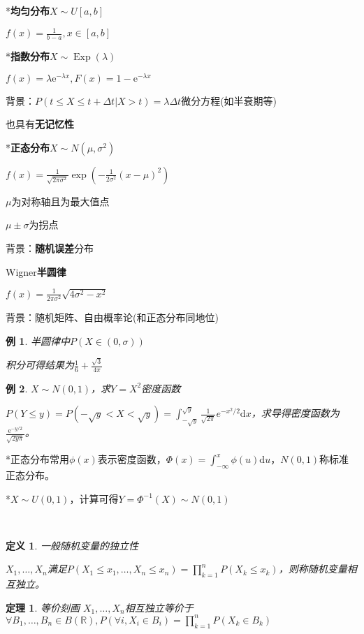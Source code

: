 \documentclass[a4paper,UTF8,fontset=windows]{ctexart}
\newtheorem{thm}{定理}[section]
\newtheorem{exmp}{例}[section]
\newtheorem{defi}{定义}[section]
\DeclareMathOperator{\Exp}{Exp}
\begin{document}
*\textbf{均匀分布}$X\sim U[a,b]$

$f(x)=\frac{1}{b-a},x\in[a,b]$

*\textbf{指数分布}$X\sim \Exp(\lambda)$

$f(x)=\lambda\mathrm{e}^{-\lambda x},F(x)=1-\mathrm{e}^{-\lambda x}$

背景：$P(t\le X\le t+\Delta t|X>t)=\lambda\Delta t$微分方程(如半衰期等)

也具有\textbf{无记忆性}

*\textbf{正态分布}$X\sim N(\mu,\sigma^2)$

$f(x)=\frac{1}{\sqrt{2\pi\sigma^2}}\exp\left(-\frac{1}{2\sigma^2}(x-\mu)^2\right)$

$\mu$为对称轴且为最大值点

$\mu\pm\sigma$为拐点

背景：\textbf{随机误差}分布

Wigner\textbf{半圆律}

$f(x)=\frac{1}{2\pi\sigma^2}\sqrt{4\sigma^2-x^2}$

背景：随机矩阵、自由概率论(和正态分布同地位)

\begin{exmp}
半圆律中$P(X\in(0,\sigma))$

积分可得结果为$\frac{1}{6}+\frac{\sqrt3}{4\pi}$
\end{exmp}

\begin{exmp} $X\sim N(0,1)$，求$Y=X^2$密度函数

$P(Y\le y)=P(-\sqrt{y}<X<\sqrt{y})=\int_{-\sqrt{y}}^{\sqrt{y}}\frac{1}{\sqrt{2\pi}}e^{-x^2/2}\mathrm{d}x$，求导得密度函数为$\frac{\mathrm{e}^{-y/2}}{\sqrt{2y\pi}}$。
\end{exmp}

*正态分布常用$\phi(x)$表示密度函数，$\Phi(x)=\int_{-\infty}^x\phi(u)\mathrm{d}u$，$N(0,1)$称标准正态分布。

*$X\sim U(0,1)$，计算可得$Y=\Phi^{-1}(X)\sim N(0,1)$

~

\begin{defi} 一般随机变量的独立性
	
$X_1,\dots,X_n$满足$P(X_1\le x_1,\dots,X_n\le x_n)=\prod_{k=1}^nP(X_k\le x_k)$，则称随机变量相互独立。
\end{defi}

\begin{thm} 等价刻画
$X_1,\dots,X_n$相互独立等价于$\forall B_1,\dots,B_n\in B(\mathbb{R}),P(\forall i,X_i\in B_i)=\prod_{k=1}^nP(X_k\in B_k)$
\end{thm}
\end{document}
